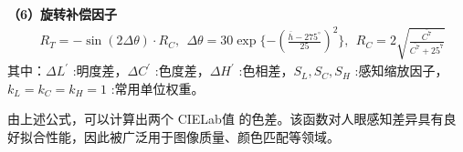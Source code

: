 \textbf{（6）旋转补偿因子}
\begin{equation}
\begin{aligned}
 &R_{T}=-\sin(2\Delta \theta)\cdot R_{C},\ \ \Delta \theta=30\exp\{-(\frac{\overline{h}-275^{\circ}}{25})^{2}\},\ \ R_{C}=2\sqrt{\frac{\overline{C^{7}}}{\overline{C^{7}}+25^{7}}}
\end{aligned}
\end{equation}
其中：$\Delta L^{'}$ :明度差，$\Delta C^{'}$ :色度差，$\Delta H^{'}$ :色相差，$S_{L},S_{C},S_{H}$ :感知缩放因子，$k_{L}=k_{C}=k_{H}=1$ :常用单位权重。

由上述公式，可以计算出两个 CIELab值 的色差。该函数对人眼感知差异具有良好拟合性能，因此被广泛用于图像质量、颜色匹配等领域。

